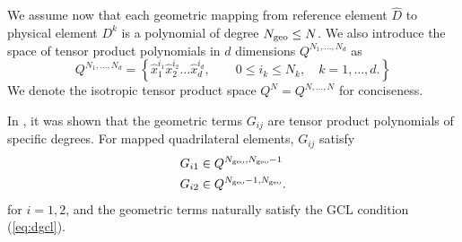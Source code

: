 \documentclass{svjour3}                     %
\renewcommand{\hat}{\widehat}
\newcommand{\diag}[1]{{\rm diag}\LRp{#1}}
\newcommand{\LRp}[1]{\left( #1 \right)}
\newcommand{\LRc}[1]{\left\{ #1 \right\}}
\begin{document}
We assume now that each geometric mapping from reference element $\hat{D}$ to physical element $D^k$ is a polynomial of degree $N_{\rm geo} \leq N$.  We also introduce the space of tensor product polynomials in $d$ dimensions $Q^{N_1,\ldots, N_d}$ as
\[
Q^{N_1,\ldots, N_d} = \LRc{ \hat{x}_1^{i_1}\hat{x}_2^{i_2}\ldots\hat{x}_d^{i_d}, \qquad 0\leq i_k \leq N_k, \quad k = 1,\ldots,d.}
\]
We denote the isotropic tensor product space $Q^N= Q^{N,\ldots,N}$ for conciseness.  

In \cite{chan2019skew}, it was shown that the geometric terms $G_{ij}$ are tensor product polynomials of specific degrees.  For mapped quadrilateral elements, $G_{ij}$ satisfy
\begin{align*}
&G_{i1} \in Q^{N_{\rm geo},N_{\rm geo}-1}\\
&G_{i2} \in Q^{N_{\rm geo}-1,N_{\rm geo}}.
\end{align*}
for $i = 1,2$, and the geometric terms naturally satisfy the GCL condition (\ref{eq:dgcl}).  
\end{document}
